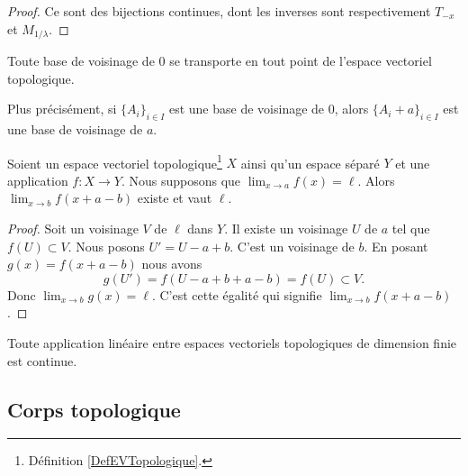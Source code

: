 \begin{proof}
	Ce sont des bijections continues, dont les inverses sont respectivement \( T_{-x} \) et \( M_{1/\lambda} \).
\end{proof}

\begin{corollary}\label{PropInvarianceTopologie}
	Toute base de voisinage de \( 0 \) se transporte en tout point de l'espace vectoriel topologique.

	Plus précisément, si \( \{ A_i \}_{i\in I}\) est une base de voisinage de \( 0\), alors \( \{ A_i+a \}_{i\in I}\) est une base de voisinage de \( a\).
\end{corollary}

\begin{lemma}      \label{LEMooAHIGooJhpPvo}
	Soient un espace vectoriel topologique\footnote{Définition \ref{DefEVTopologique}.} \( X\) ainsi qu'un espace séparé \( Y\) et une application \( f\colon X\to Y\). Nous supposons que \( \lim_{x\to a}f(x)=\ell\). Alors \( \lim_{x\to b} f(x+a-b)\) existe et vaut \( \ell\).
\end{lemma}

\begin{proof}
	Soit un voisinage \( V\) de \( \ell\) dans \( Y\). Il existe un voisinage \( U\) de \( a\) tel que \( f(U)\subset V\). Nous posons \( U'=U-a+b\). C'est un voisinage de \( b\). En posant \( g(x)=f(x+a-b)\) nous avons
	\begin{equation}
		g(U')=f(U-a+b+a-b)=f(U)\subset V.
	\end{equation}
	Donc \( \lim_{x\to b}g(x)=\ell\). C'est cette égalité qui signifie \( \lim_{x\to b}f(x+a-b)\).
\end{proof}

\begin{proposition}     \label{PROPooBEHTooBrLWuh}
    Toute application linéaire entre espaces vectoriels topologiques de dimension finie est continue.
\end{proposition}

\subsection{Corps topologique}

